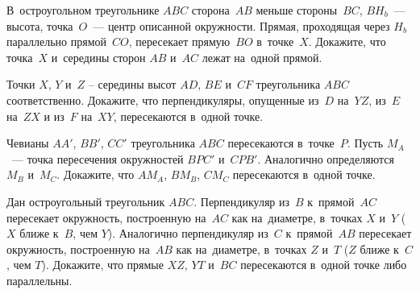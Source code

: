 \begin{problems}
\item
В~остроугольном треугольнике $ABC$ сторона~$AB$ меньше стороны~$BC$,
$B H_{b}$~--- высота, точка~$O$~--- центр описанной окружности.
Прямая, проходящая через $H_{b}$ параллельно прямой~$CO$, пересекает
прямую~$BO$ в~точке~$X$.
Докажите, что точка~$X$ и~середины сторон $AB$ и~$AC$ лежат на~одной прямой.

\item
Точки $X$, $Y$ и~$Z$ -- середины высот $AD$, $BE$ и~$CF$ треугольника $ABC$
соответственно.
Докажите, что перпендикуляры, опущенные из~$D$ на~$YZ$, из~$E$ на~$ZX$
и из~$F$ на~$XY$, пересекаются в~одной точке.

\item
Чевианы $AA'$, $BB'$, $CC'$ треугольника $ABC$ пересекаются в~точке~$P$.
Пусть $M_{A}$~--- точка пересечения окружностей $BPC'$ и~$CPB'$.
Аналогично определяются $M_{B}$ и~$M_{C}$.
Докажите, что $A M_{A}$, $B M_{B}$, $C M_{C}$ пересекаются в~одной точке.

\item
Дан остроугольный треугольник $ABC$.
Перпендикуляр из~$B$ к~прямой~$AC$ пересекает окружность, построенную на~$AC$
как на~диаметре, в~точках $X$ и~$Y$ ($X$ ближе к~$B$, чем $Y$).
Аналогично перпендикуляр из~$C$ к~прямой~$AB$ пересекает окружность,
построенную на~$AB$ как на~диаметре, в~точках $Z$ и~$T$
($Z$ ближе к~$C$, чем $T$).
Докажите, что прямые $XZ$, $YT$ и~$BC$ пересекаются в~одной точке либо
параллельны.




\end{problems}


